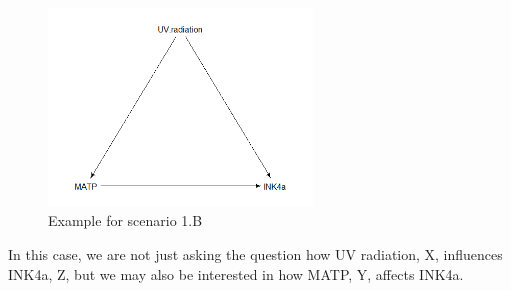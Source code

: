 \documentclass{article}
\begin{document}
\begin{figure}[h]
\caption{Example for scenario 1.B}
\includegraphics[width=7cm]{m.uv.i.DAG.png}
\centering
\end{figure}

In this case, we are not just asking the question how UV radiation, X, influences INK4a, Z, but we may also be interested in how MATP, Y, affects INK4a.\par
\end{document}
